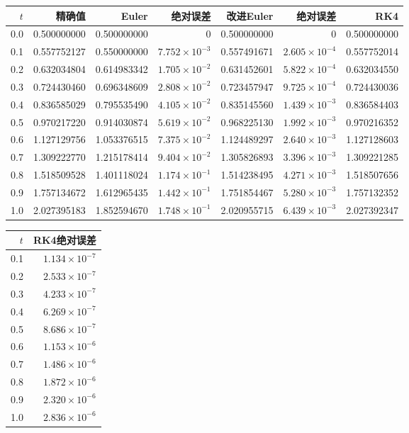\begin{center}\small\setlength{\tabcolsep}{3pt}
\begin{tabular}{rrrrrrr}\toprule
$t$&精确值&Euler&绝对误差&改进Euler&绝对误差&RK4\\\midrule
0.0&0.500000000&0.500000000&$0$&0.500000000&$0$&0.500000000\\
0.1&0.557752127&0.550000000&$7.752\times10^{-3}$&0.557491671&$2.605\times10^{-4}$&0.557752014\\
0.2&0.632034804&0.614983342&$1.705\times10^{-2}$&0.631452601&$5.822\times10^{-4}$&0.632034550\\
0.3&0.724430460&0.696348609&$2.808\times10^{-2}$&0.723457947&$9.725\times10^{-4}$&0.724430036\\
0.4&0.836585029&0.795535490&$4.105\times10^{-2}$&0.835145560&$1.439\times10^{-3}$&0.836584403\\
0.5&0.970217220&0.914030874&$5.619\times10^{-2}$&0.968225130&$1.992\times10^{-3}$&0.970216352\\
0.6&1.127129756&1.053376515&$7.375\times10^{-2}$&1.124489297&$2.640\times10^{-3}$&1.127128603\\
0.7&1.309222770&1.215178414&$9.404\times10^{-2}$&1.305826893&$3.396\times10^{-3}$&1.309221285\\
0.8&1.518509528&1.401118024&$1.174\times10^{-1}$&1.514238495&$4.271\times10^{-3}$&1.518507656\\
0.9&1.757134672&1.612965435&$1.442\times10^{-1}$&1.751854467&$5.280\times10^{-3}$&1.757132352\\
1.0&2.027395183&1.852594670&$1.748\times10^{-1}$&2.020955715&$6.439\times10^{-3}$&2.027392347\\
\bottomrule\end{tabular}\end{center}
\begin{center}\small\begin{tabular}{rr}\toprule $t$&RK4绝对误差\\\midrule
0.1&$1.134\times10^{-7}$\\
0.2&$2.533\times10^{-7}$\\
0.3&$4.233\times10^{-7}$\\
0.4&$6.269\times10^{-7}$\\
0.5&$8.686\times10^{-7}$\\
0.6&$1.153\times10^{-6}$\\
0.7&$1.486\times10^{-6}$\\
0.8&$1.872\times10^{-6}$\\
0.9&$2.320\times10^{-6}$\\
1.0&$2.836\times10^{-6}$\\
\bottomrule\end{tabular}\end{center}
